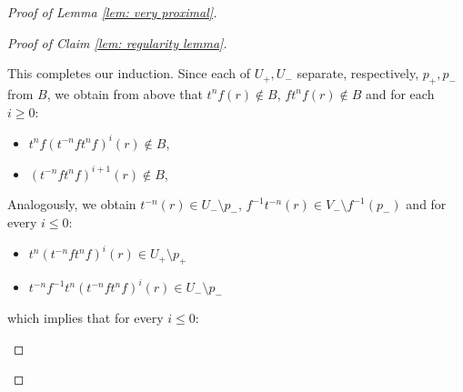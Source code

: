 \documentclass[12pt]{article}
\theoremstyle{definition}
\newcommand{\ve}{\varepsilon}
\begin{document}
\begin{proof} [Proof of Lemma \ref{lem: very proximal}]
\begin{proof}[Proof of Claim \ref{lem: regularity lemma}]
\begin{enumerate}
\begin{enumerate}
\begin{enumerate}

    This completes our induction. Since each of $U_+, U_-$ separate, respectively, $p_+, p_-$ from $B$, we obtain from above that $t^n f(r) \notin B$, $ft^nf(r) \notin B$ and for each $i \geq 0$:

    \begin{itemize}
        \item $t^n f(t^{-n}f t^n f)^{i}(r) \notin B$,
        \item $(t^{-n}f t^n f)^{i+1}(r) \notin B$,
    \end{itemize}

    Analogously, we obtain $t^{-n} (r) \in U_- \setminus p_-$, $f^{-1} t^{-n}(r) \in V_- \setminus f^{-1}(p_-)$ and for every $i \leq 0$: 

    \begin{itemize} 
        \item $t^n(t^{-n}ft^n f)^{i} (r) \in U_+ \setminus p_+$
        \item $t^{-n}f^{-1}t^n(t^{-n}ft^n f)^{i} (r) \in U_- \setminus p_-$
    \end{itemize}

    which implies that for every $i \leq 0$: 


\end{enumerate}
\end{enumerate}
\end{enumerate}
\end{proof}
\end{proof}
\end{document}
